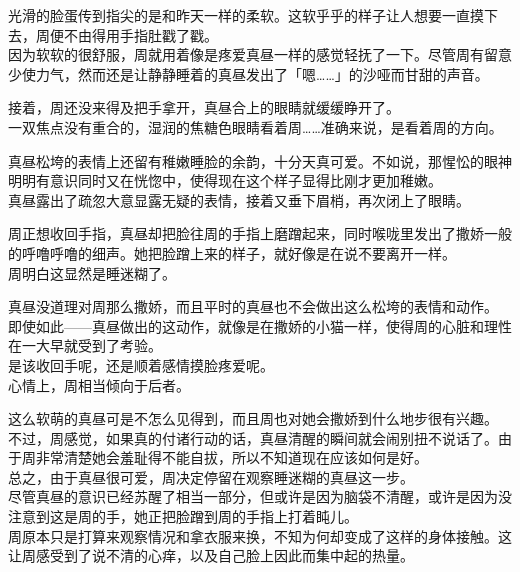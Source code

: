 光滑的脸蛋传到指尖的是和昨天一样的柔软。这软乎乎的样子让人想要一直摸下去，周便不由得用手指肚戳了戳。\\

因为软软的很舒服，周就用着像是疼爱真昼一样的感觉轻抚了一下。尽管周有留意少使力气，然而还是让静静睡着的真昼发出了「嗯……」的沙哑而甘甜的声音。

接着，周还没来得及把手拿开，真昼合上的眼睛就缓缓睁开了。\\

一双焦点没有重合的，湿润的焦糖色眼睛看着周……准确来说，是看着周的方向。

真昼松垮的表情上还留有稚嫩睡脸的余韵，十分天真可爱。不如说，那惺忪的眼神明明有意识同时又在恍惚中，使得现在这个样子显得比刚才更加稚嫩。\\

真昼露出了疏忽大意显露无疑的表情，接着又垂下眉梢，再次闭上了眼睛。

周正想收回手指，真昼却把脸往周的手指上磨蹭起来，同时喉咙里发出了撒娇一般的呼噜呼噜的细声。她把脸蹭上来的样子，就好像是在说不要离开一样。\\

周明白这显然是睡迷糊了。

真昼没道理对周那么撒娇，而且平时的真昼也不会做出这么松垮的表情和动作。\\

即使如此——真昼做出的这动作，就像是在撒娇的小猫一样，使得周的心脏和理性在一大早就受到了考验。\\

是该收回手呢，还是顺着感情摸脸疼爱呢。\\

心情上，周相当倾向于后者。

这么软萌的真昼可是不怎么见得到，而且周也对她会撒娇到什么地步很有兴趣。\\

不过，周感觉，如果真的付诸行动的话，真昼清醒的瞬间就会闹别扭不说话了。由于周非常清楚她会羞耻得不能自拔，所以不知道现在应该如何是好。\\

总之，由于真昼很可爱，周决定停留在观察睡迷糊的真昼这一步。\\

尽管真昼的意识已经苏醒了相当一部分，但或许是因为脑袋不清醒，或许是因为没注意到这是周的手，她正把脸蹭到周的手指上打着盹儿。\\

周原本只是打算来观察情况和拿衣服来换，不知为何却变成了这样的身体接触。这让周感受到了说不清的心痒，以及自己脸上因此而集中起的热量。\\

